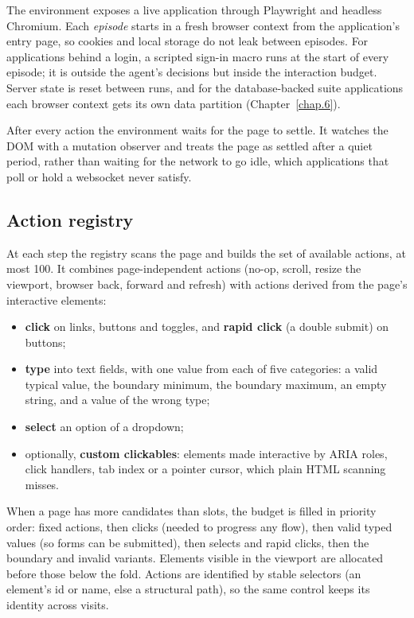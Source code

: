 The environment exposes a live application through Playwright and headless Chromium. Each
\emph{episode} starts in a fresh browser context from the application's entry page, so
cookies and local storage do not leak between episodes. For applications behind a login, a
scripted sign-in macro runs at the start of every episode; it is outside the agent's
decisions but inside the interaction budget. Server state is reset between runs, and for the
database-backed suite applications each browser context gets its own data partition
(Chapter~\ref{chap.6}).

After every action the environment waits for the page to settle. It watches the DOM with a
mutation observer and treats the page as settled after a quiet period, rather than waiting
for the network to go idle, which applications that poll or hold a websocket never
satisfy.

\subsection{Action registry}

At each step the registry scans the page and builds the set of available actions, at most
100. It combines page-independent actions (no-op, scroll, resize the viewport, browser
back, forward and refresh) with actions derived from the page's interactive elements:

\begin{itemize}[noitemsep]
  \item \textbf{click} on links, buttons and toggles, and \textbf{rapid click} (a double
        submit) on buttons;
  \item \textbf{type} into text fields, with one value from each of five categories: a
        valid typical value, the boundary minimum, the boundary maximum, an empty string,
        and a value of the wrong type;
  \item \textbf{select} an option of a dropdown;
  \item optionally, \textbf{custom clickables}: elements made interactive by ARIA roles,
        click handlers, tab index or a pointer cursor, which plain HTML scanning misses.
\end{itemize}

When a page has more candidates than slots, the budget is filled in priority order: fixed
actions, then clicks (needed to progress any flow), then valid typed values (so forms can be
submitted), then selects and rapid clicks, then the boundary and invalid variants. Elements
visible in the viewport are allocated before those below the fold. Actions are identified by
stable selectors (an element's id or name, else a structural path), so the same control
keeps its identity across visits.

